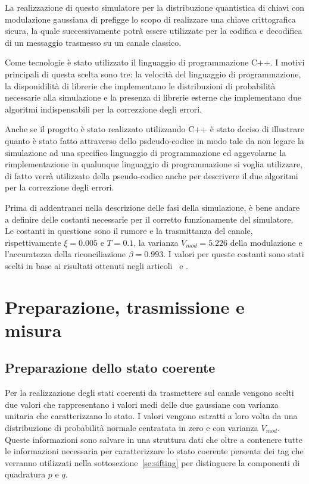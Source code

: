 La realizzazione di questo simulatore per la distribuzione quantistica di chiavi con modulazione gaussiana di prefigge lo scopo di realizzare una chiave crittografica sicura, la quale successivamente potr\`a essere utilizzate per la codifica e decodifica di un messaggio trasmesso su un canale classico. 

Come tecnologie \`e stato utilizzato il linguaggio di programmazione C++. I motivi principali di questa scelta sono tre: la velocit\`a del linguaggio di programmazione, la disponidilit\`a di librerie che implementano le distribuzioni di probabilit\`a necessarie alla simulazione e la presenza di librerie esterne che implementano due algoritmi indispensabili per la correzzione degli errori.

Anche se il progetto \`e stato realizzato utilizzando C++ \`e stato deciso di illustrare quanto \`e stato fatto attraverso dello psdeudo-codice in modo tale da non legare la simulazione ad una specifico linguaggio di programmazione ed aggevolarne la rimplementazione in qualunque linguaggio di programmazione si voglia utilizzare, di fatto verr\`a utilizzato della pseudo-codice anche per descrivere il due algoritmi per la correzzione degli errori.

Prima di addentranci nella descrizione delle fasi della simulazione, \`e bene andare a definire delle costanti necessarie per il corretto funzionamente del simulatore. Le costanti in questione sono il rumore e la trasmittanza del canale, rispettivamente $\xi = 0.005$ e $T=0.1$, la varianza $V_{mod}=5.226$ della modulazione e l'accuratezza della riconciliazione $\beta = 0.993$. I valori per queste costanti sono stati scelti in base ai risultati ottenuti negli articoli~\cite{https://doi.org/10.1002/qute.201800011} e \cite{e24101463}.

\section{Preparazione, trasmissione e misura}

\subsection{Preparazione dello stato coerente}
Per la realizzazione degli stati coerenti da trasmettere sul canale vengono scelti due valori che rappresentano i valori medi delle due gaussiane con varianza unitaria che caratterizzano lo stato. I valori vengono estratti a loro volta da una distribuzione di probabilit\`a normale centratata in zero e con varianza $V_{mod}$. Queste informazioni sono salvare in una struttura dati che oltre a contenere tutte le informazioni necessaria per caratterizzare lo stato coerente persenta dei tag che verranno utilizzati nella sottosezione~\ref{se:sifting} per distinguere la componenti di quadratura $p$ e $q$.

